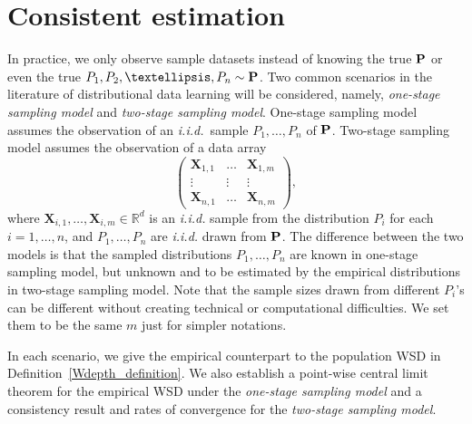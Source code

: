 \documentclass{imsart}
\numberwithin{equation}{section}
\def\R{\mathbb{R}}
\def\X{\mathbf{X}}
\begin{document}
\section{Consistent estimation} \label{consistency}
In practice, we only observe sample datasets instead of knowing the true ${\bf P}$ or even the true $P_1, P_2, \ldots, P_n \sim {\bf P}$.
Two common scenarios in the literature of distributional data learning \citep{bachoc2023improved, meunier2022distribution,szabo2016learning} will be considered, namely, {\it one-stage sampling model} and {\it two-stage sampling model}.
One-stage sampling model assumes the observation of an \textit{i.i.d.}\ sample $P_1, \dots, P_n$ of ${\bf P}$. Two-stage sampling model assumes the observation of a data array
\begin{equation}\label{eq:dataTensor}
	\left(\begin{array}{ccc}
		\X_{1,1}  & \dots & \X_{1,m} \\
		\vdots  & \vdots & \vdots\\
		\X_{n,1}  & \dots & \X_{n,m}
	\end{array}\right),
\end{equation}
where $\X_{i,1}, \dots, \X_{i,m} \in \R^d$ is an \textit{i.i.d.} sample from the distribution $P_i$ for each $i=1, \dots, n$, and $P_1, \dots, P_n$ are \textit{i.i.d.} drawn from ${\bf P}$. 
The difference between the two models is that the sampled distributions $P_1, \ldots, P_n$ are known in one-stage sampling model, but unknown and to be estimated by the empirical distributions in two-stage sampling model. Note that the sample sizes drawn from different $P_i$'s can be different without creating technical or computational difficulties. We set them to be the same $m$ just for simpler notations.


In each scenario, we give the empirical counterpart to the population WSD in Definition~\ref{Wdepth_definition}.  
We also establish a point-wise central limit theorem for the empirical WSD under the {\it one-stage sampling model} and a consistency result
and rates of convergence 
for the   {\it two-stage sampling model}. 
\end{document}
